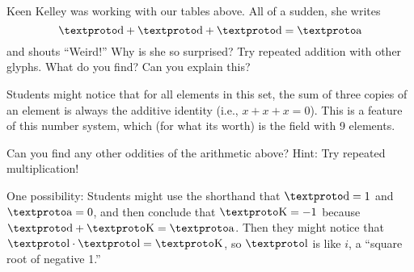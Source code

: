 \documentclass[nooutcomes]{ximera}
\begin{document}
\begin{problem} 
Keen Kelley was working with our tables above. All of a sudden, she
writes
\[
\loo + \loo + \loo = \lo
\]
and shouts ``Weird!'' Why is she so surprised? Try repeated addition
with other glyphs. What do you find? Can you explain this?
\begin{teachingnote}
Students might notice that for all elements in this set, the sum of three copies of an element is always the additive identity (i.e., $x + x + x = 0$).  This is a feature of this number system, which (for what its worth) is the field with 9 elements.  
\end{teachingnote}
\end{problem}


\begin{problem}
Can you find any other oddities of the arithmetic above? Hint: Try
repeated multiplication!
\begin{teachingnote}
One possibility: Students might use the shorthand that $\loo = 1$ and $\lo = 0$, and then conclude that $\ld = -1$ because $\loo+\ld=\lo$.  Then they might notice that $\lh\cdot \lh = \ld$, so $\lh$ is like $i$, a ``square root of negative 1.''
\end{teachingnote}
\end{problem}
\end{document}
